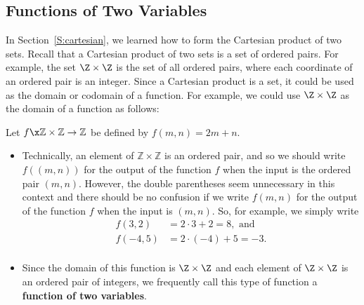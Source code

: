 \subsection*{Functions of Two Variables} \label{ss:functiontwovar}
In Section~\ref{S:cartesian}, we learned how to form the Cartesian product of two sets.  Recall that a Cartesian product of two sets is a set of ordered pairs.  For example, the set $\Z \times \Z$ is the set of all ordered pairs, where each coordinate of an ordered pair is an integer.  Since a Cartesian product is a set, it could be used as the domain or codomain of a function.  For example, we could use  $\Z \times \Z$ as the domain of a function as follows:
%
\begin{center}
Let $f\x \mathbb{Z} \times \mathbb{Z} \to \mathbb{Z}$ be defined by  
$f( {m, n} ) = 2m + n$.
\end{center}

\begin{itemize}
\item Technically, an element of  $\mathbb{Z} \times \mathbb{Z}$  is an ordered pair, and so we should write  $f( {( {m, n} )} )$ for the output of the function  $f$   when the input is  the ordered pair 
$\left( {m, n} \right)$.  However, the double parentheses seem unnecessary in this context and there should be no confusion if we write  $f( {m, n} )$ for the output of the function  $f$   when the input is  
$\left( {m, n} \right)$.  So, for example, we simply write
\begin{align*}
  f( {3, 2} )    &= 2 \cdot 3 + 2 = 8,\text{ and} \\ 
  f( { - 4, 5} ) &= 2 \cdot \left( { - 4} \right) + 5 =  - 3. \\ 
\end{align*} 
\item Since the domain of this function is $\Z \times \Z$ and each element of $\Z \times \Z$ is an ordered pair of integers, we frequently call this type of function a \textbf{function of two variables}.
%
\end{itemize}

